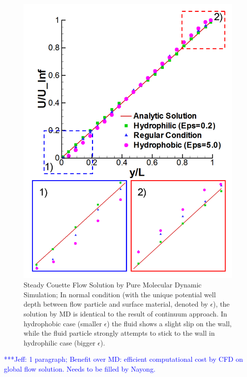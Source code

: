 \documentclass[conference,final]{IEEEtran}
\newcommand{\skonote}[1]{ {\textcolor{blue} { ***Jeff: #1 }}}
\newcommand{\skonote}[1]{}
\begin{document}
%
\begin{figure}[ht]
\centering
\includegraphics[width=0.9\linewidth]{MD_Solution_New.pdf}
\vskip-0.2cm
\caption{\small Steady Couette Flow Solution by Pure Molecular Dynamic Simulation; In normal condition (with the unique potential well depth between flow particle and surface material, denoted by $\epsilon$), the solution by MD is identical to the result of continuum approach. In hydrophobic case (smaller $\epsilon$) the fluid shows a slight slip on the wall, while the fluid particle strongly attempts to stick to the wall in hydrophilic case (bigger $\epsilon$).}
\label{MD_Solution_New}
\end{figure}


\skonote{1 paragraph; Benefit over MD: efficient computational cost by CFD on global flow solution. Needs to be filled by Nayong.}
\newline
\end{document}
